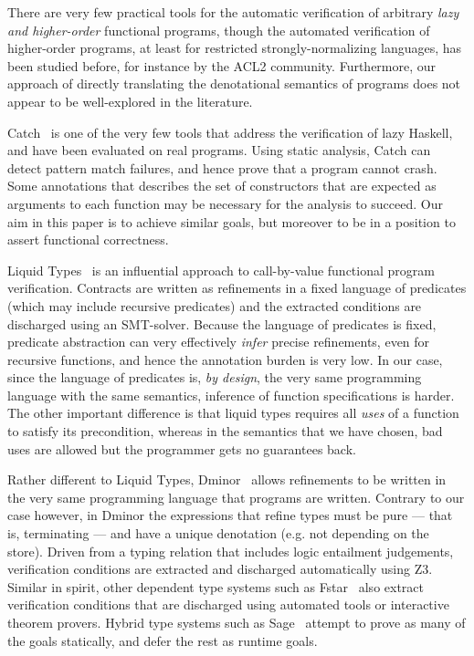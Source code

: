 There are very few practical tools for the automatic
verification of arbitrary {\em lazy and higher-order} functional programs, though 
the automated verification of higher-order programs, at least for restricted 
strongly-normalizing languages, has been studied before, for instance by the ACL2 
community. Furthermore, our approach of directly translating the denotational 
semantics of programs does not appear to be well-explored in the literature.

Catch~\cite{Mitchell:2008:PBE:1411286.1411293} is one of the very few tools that
address the verification of lazy Haskell, and have been evaluated on real programs.
Using static analysis, Catch can detect pattern match failures, and hence
prove that a program cannot crash. Some annotations that describes the set of
constructors that are expected as arguments to each function may be
necessary for the analysis to succeed. 
Our aim in this paper is to achieve similar goals, but 
moreover to be in a position to assert functional correctness.

Liquid Types~\cite{Rondon:2008:LT:1375581.1375602} is an influential
approach to call-by-value functional program verification. 
Contracts are written as refinements in a fixed language of predicates (which may
include recursive predicates) and the extracted conditions are discharged using an
SMT-solver. Because the language of predicates is fixed, predicate abstraction can
very effectively {\em infer} precise refinements, even for recursive functions, and
hence the annotation burden is very low. In our case, since the language of predicates
is, {\em by design}, the very same programming language with the same semantics, inference
of function specifications is harder. The other important difference is that liquid types
requires all {\em uses} of a function to satisfy its precondition, whereas in the semantics
that we have chosen, bad uses are allowed but the programmer gets no guarantees back.

Rather different to Liquid Types, Dminor~\cite{Bierman+:subtyping} allows 
refinements to be written in the very same programming language that programs are written.
Contrary to our case however, in Dminor
the expressions that refine types must be pure --- that is, terminating --- and have a unique
denotation (e.g. not depending on the store). 
Driven from a typing relation that includes
logic entailment judgements, verification conditions are extracted and discharged automatically using Z3.
Similar in spirit, other dependent type systems such
as Fstar~\cite{fstar} also extract verification conditions that are discharged
using automated tools
or interactive theorem provers. Hybrid type systems such as Sage~\cite{Knowles+:sage}
attempt to prove as many of the goals statically, and defer the rest as runtime
goals.

